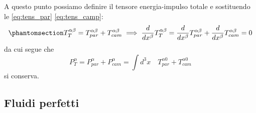 A questo punto possiamo definire il tensore energia-impulso totale e sostituendo le \eqref{eq:tens_par} \eqref{eq:tens_camp}:
\begin{equation}\phantomsection\label{eq:tens_cont}
T^{\alpha\beta}_T=T^{\alpha\beta}_{par}+T^{\alpha\beta}_{cam} \implies\dfrac{d}{dx^\beta}T^{\alpha\beta}_T=\dfrac{d}{dx^\beta}T^{\alpha\beta}_{par}+\dfrac{d}{dx^\beta}T^{\alpha\beta}_{cam}=0
\end{equation}
da cui segue che 
\begin{equation}
P^{\alpha}_T=P^{\alpha}_{par}+P^{\alpha}_{cam}=\int d^3x\quad T^{\alpha0}_{par}+T^{\alpha0}_{cam}
\end{equation}
si conserva.

\subsection{Fluidi perfetti}

